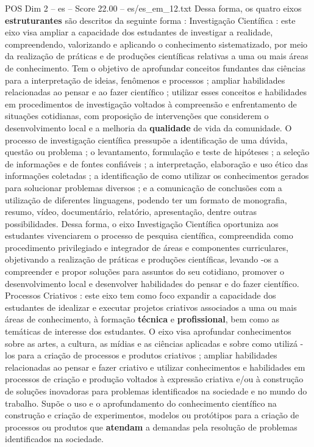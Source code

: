 \begin{textsample}{POS Dim 2 – es – Score 22.00 – es/es\_em\_12.txt}
Dessa forma, os quatro eixos \textbf{estruturantes} são descritos da seguinte forma : Investigação Científica : este eixo visa ampliar a capacidade dos estudantes de investigar a realidade, compreendendo, valorizando e aplicando o conhecimento sistematizado, por meio da realização de práticas e de produções científicas relativas a uma ou mais áreas de conhecimento.
Tem o objetivo de aprofundar conceitos fundantes das ciências para a interpretação de ideias, fenômenos e processos ; ampliar habilidades relacionadas ao pensar e ao fazer científico ; utilizar esses conceitos e habilidades em procedimentos de investigação voltados à compreensão e enfrentamento de situações cotidianas, com proposição de intervenções que considerem o desenvolvimento local e a melhoria da \textbf{qualidade} de vida da comunidade.
O processo de investigação científica pressupõe a identificação de uma dúvida, questão ou problema ; o levantamento, formulação e teste de hipóteses ; a seleção de informações e de fontes confiáveis ; a interpretação, elaboração e uso ético das informações coletadas ; a identificação de como utilizar os conhecimentos gerados para solucionar problemas diversos ; e a comunicação de conclusões com a utilização de diferentes linguagens, podendo ter um formato de monografia, resumo, vídeo, documentário, relatório, apresentação, dentre outras possibilidades.
Dessa forma, o eixo Investigação Científica oportuniza aos estudantes vivenciarem o processo de pesquisa científica, compreendida como procedimento privilegiado e integrador de áreas e componentes curriculares, objetivando a realização de práticas e produções científicas, levando -os a compreender e propor soluções para assuntos do seu cotidiano, promover o desenvolvimento local e desenvolver habilidades do pensar e do fazer científico.
Processos Criativos : este eixo tem como foco expandir a capacidade dos estudantes de idealizar e executar projetos criativos associados a uma ou mais áreas de conhecimento, à formação \textbf{técnica} e \textbf{profissional}, bem como as temáticas de interesse dos estudantes.
O eixo visa aprofundar conhecimentos sobre as artes, a cultura, as mídias e as ciências aplicadas e sobre como utilizá -los para a criação de processos e produtos criativos ; ampliar habilidades relacionadas ao pensar e fazer criativo e utilizar conhecimentos e habilidades em processos de criação e produção voltados à expressão criativa e/ou à construção de soluções inovadoras para problemas identificados na sociedade e no mundo do trabalho.
Supõe o uso e o aprofundamento do conhecimento científico na construção e criação de experimentos, modelos ou protótipos para a criação de processos ou produtos que \textbf{atendam} a demandas pela resolução de problemas identificados na sociedade.

\end{textsample}

